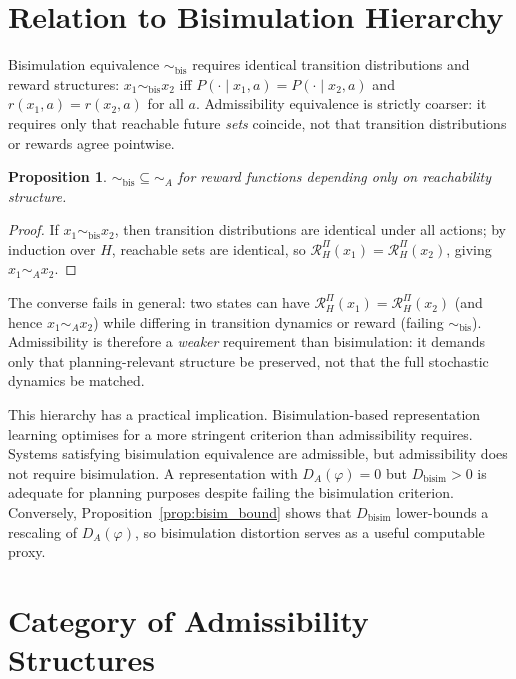\documentclass[10pt,twocolumn]{article}
\theoremstyle{plain}
\newtheorem{proposition}{Proposition}
\theoremstyle{definition}
\theoremstyle{remark}
\newcommand{\simA}{\sim_{\!A}}
\newcommand{\RHP}{\mathcal{R}_{H}^{\Pi}}
\newcommand{\DA}{D_{A}(\varphi)}
\begin{document}
\section{Relation to Bisimulation Hierarchy}
\label{app:bisim}

Bisimulation equivalence $\sim_{\mathrm{bis}}$ requires identical transition
distributions and reward structures: $x_1\sim_{\mathrm{bis}} x_2$ iff
$P(\cdot\mid x_1,a)=P(\cdot\mid x_2,a)$ and $r(x_1,a)=r(x_2,a)$ for all $a$.
Admissibility equivalence is strictly coarser: it requires only that reachable
future \emph{sets} coincide, not that transition distributions or rewards agree
pointwise.

\begin{proposition}
${\sim_{\mathrm{bis}}}\subseteq{\simA}$ for reward functions depending only on
reachability structure.
\end{proposition}

\begin{proof}
If $x_1\sim_{\mathrm{bis}} x_2$, then transition distributions are identical
under all actions; by induction over $H$, reachable sets are identical, so
$\RHP(x_1)=\RHP(x_2)$, giving $x_1\simA x_2$.
\end{proof}

The converse fails in general: two states can have $\RHP(x_1)=\RHP(x_2)$ (and
hence $x_1\simA x_2$) while differing in transition dynamics or reward (failing
$\sim_{\mathrm{bis}}$). Admissibility is therefore a \emph{weaker} requirement
than bisimulation: it demands only that planning-relevant structure be preserved,
not that the full stochastic dynamics be matched.

This hierarchy has a practical implication. Bisimulation-based representation
learning \citep{zhang2021learning,kemertas2021towards} optimises for a more
stringent criterion than admissibility requires. Systems satisfying bisimulation
equivalence are admissible, but admissibility does not require bisimulation. A
representation with $\DA=0$ but $D_{\mathrm{bisim}}>0$ is adequate for planning
purposes despite failing the bisimulation criterion. Conversely,
Proposition~\ref{prop:bisim_bound} shows that $D_{\mathrm{bisim}}$ lower-bounds
a rescaling of $\DA$, so bisimulation distortion serves as a useful computable
proxy.

\section{Category of Admissibility Structures}
\label{app:cat}
\end{document}
